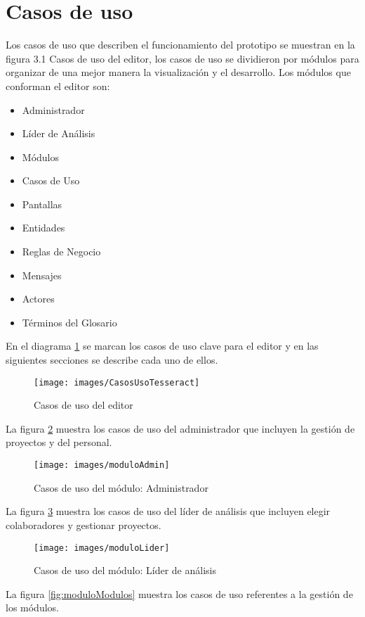\section{Casos de uso}
Los casos de uso que describen el funcionamiento del prototipo se muestran en la figura 3.1 Casos de uso del editor, los casos de uso se dividieron por módulos para organizar de una mejor manera la visualización y el desarrollo. Los módulos que conforman el editor son:

\begin{itemize}
	\item Administrador
	\item Líder de Análisis
	\item Módulos
	\item Casos de Uso
	\item Pantallas
	\item Entidades
	\item Reglas de Negocio
	\item Mensajes
	\item Actores
	\item Términos del Glosario
\end{itemize}
\newpage
En el diagrama \ref{fig:CasosUsoTesseract} se marcan los casos de uso clave para el editor y en las siguientes secciones se describe cada uno de ellos.

	\begin{figure}[H]
		\begin{center}
			\texttt{[image: images/CasosUsoTesseract]}
			\caption{Casos de uso del editor}
			\label{fig:CasosUsoTesseract}
		\end{center}
	\end{figure}
\newpage

La figura \ref{fig:moduloAdmin} muestra los casos de uso del administrador que incluyen la gestión de proyectos y del personal.

	\begin{figure}[H]
		\begin{center}
			\texttt{[image: images/moduloAdmin]}
			\caption{Casos de uso del módulo: Administrador}
			\label{fig:moduloAdmin}
		\end{center}
	\end{figure}
\newpage
La figura \ref{fig:moduloLider} muestra los casos de uso del líder de análisis que incluyen elegir colaboradores y gestionar proyectos.

\begin{figure}[H]
	\begin{center}
		\texttt{[image: images/moduloLider]}
		\caption{Casos de uso del módulo: Líder de análisis}
		\label{fig:moduloLider}
	\end{center}
\end{figure}
\newpage
La figura \ref{fig:moduloModulos} muestra los casos de uso referentes a la gestión de los módulos.

